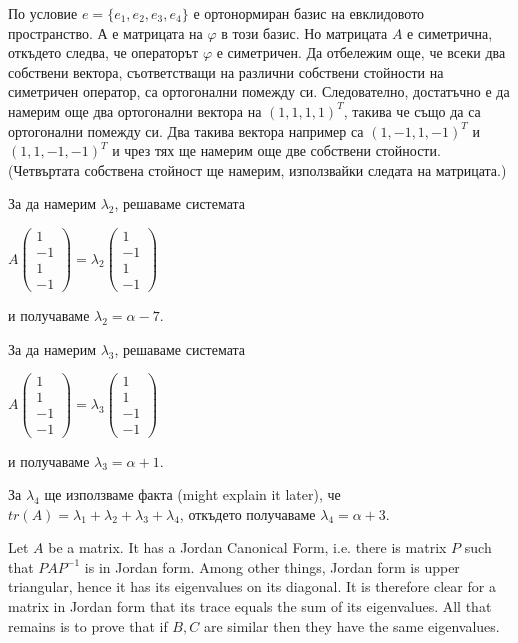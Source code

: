 \documentclass{article}
\begin{document}
\justify
По условие $e = \{e_1, e_2, e_3, e_4\}$ е ортонормиран базис на евклидовото пространство. $А$ е матрицата на $\varphi$ в този базис. Но матрицата $A$ е симетрична, откъдето следва, че операторът $\varphi$ е симетричен. Да отбележим още, че всеки два собствени вектора, съответстващи на различни собствени стойности на симетричен оператор, са ортогонални помежду си. Следователно, достатъчно е да намерим още два ортогонални вектора на $(1,1,1,1)^{T}$, такива че също да са ортогонални помежду си. Два такива вектора например са $(1,-1,1,-1)^{T}$ и $(1,1,-1,-1)^{T}$ и чрез тях ще намерим още две собствени стойности. (Четвъртата собствена стойност ще намерим, използвайки следата на матрицата.)

\justify
За да намерим $\lambda_2$, решаваме системата

\begin{center}
    $A\begin{pmatrix}
         1 \\
         -1 \\
         1 \\
         -1
         \end{pmatrix} = \lambda_2 \begin{pmatrix}
         1 \\
         -1 \\
         1 \\
         -1
         \end{pmatrix}$
\end{center}

\justify
и получаваме $\lambda_2 = \alpha - 7$.

\justify
За да намерим $\lambda_3$, решаваме системата

\begin{center}
    $A\begin{pmatrix}
         1 \\
         1 \\
         -1 \\
         -1
         \end{pmatrix} = \lambda_3 \begin{pmatrix}
         1 \\
         1 \\
         -1 \\
         -1
         \end{pmatrix}$
\end{center}

\justify
и получаваме $\lambda_3 = \alpha + 1$.

\justify
За $\lambda_4$ ще използваме факта (might explain it later), че $tr(A) = \lambda_1 + \lambda_2 + \lambda_3 + \lambda_4$, откъдето получаваме $\lambda_4 = \alpha + 3$.

\justify
Let $A$ be a matrix.  It has a Jordan Canonical Form, i.e. there is matrix $P$ such that $PAP^{-1}$ is in Jordan form.  Among other things, Jordan form is upper triangular, hence it has its eigenvalues on its diagonal.  It is therefore clear for a matrix in Jordan form that its trace equals the sum of its eigenvalues.  All that remains is to prove that if $B,C$ are similar then they have the same eigenvalues.
\end{document}
